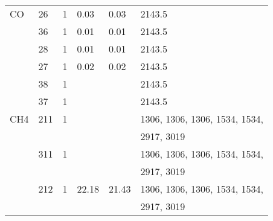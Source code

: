 \begin{longtable}{llllll}
\hline
  CO& 26& 1& 0.03& 0.03& 2143.5\\
    & 36& 1& 0.01& 0.01& 2143.5\\
    & 28& 1& 0.01& 0.01& 2143.5\\
    & 27& 1& 0.02& 0.02& 2143.5\\
    & 38& 1& & & 2143.5\\
    & 37& 1& & & 2143.5\\
%
%
\hline
  CH4& 211& 1&      &      & 1306, 1306, 1306, 1534, 1534,\\
     &    &  &      &      & 2917, 3019\\
     & 311& 1&      &      & 1306, 1306, 1306, 1534, 1534,\\
     &    &  &      &      & 2917, 3019\\
     & 212& 1& 22.18& 21.43& 1306, 1306, 1306, 1534, 1534,\\
     &    &  &      &      & 2917, 3019\\



\end{longtable}
